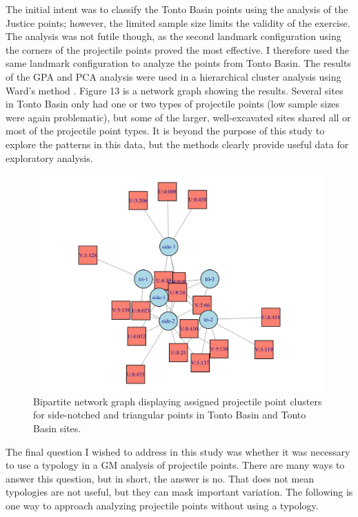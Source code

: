 \documentclass[a4paper]{article}
\begin{document}
The initial intent was to classify the Tonto Basin points using the analysis of the Justice points; however, the limited sample size limits the validity of the exercise. The analysis was not futile though, as the second landmark configuration using the corners of the projectile points proved the most effective. I therefore used the same landmark configuration to analyze the points from Tonto Basin. The results of the GPA and PCA analysis were used in a hierarchical cluster analysis using Ward's method \autocite[see][]{Murtagh2014-mb}. Figure 13 is a network graph showing the results. Several sites in Tonto Basin only had one or two types of projectile points (low sample sizes were again problematic), but some of the larger, well-excavated sites shared all or most of the projectile point types. It is beyond the purpose of this study to explore the patterns in this data, but the methods clearly provide useful data for exploratory analysis.

\begin{figure}
\includegraphics[width=1\linewidth]{figures/TontoClusterNetwork} \caption{Bipartite network graph displaying assigned projectile point clusters for side-notched and triangular points in Tonto Basin and Tonto Basin sites.}\label{fig:TontoClusterNetwork}
\end{figure}

The final question I wished to address in this study was whether it was necessary to use a typology in a GM analysis of projectile points. There are many ways to answer this question, but in short, the answer is no. That does not mean typologies are not useful, but they can mask important variation. The following is one way to approach analyzing projectile points without using a typology.
\end{document}
